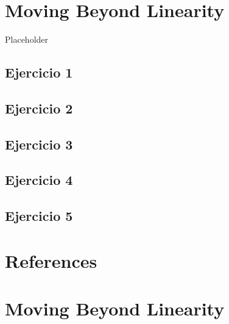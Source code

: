 \documentclass[
]{book}
\begin{document}
\hypertarget{moving-beyond-linearity}{%
\chapter{Moving Beyond Linearity}\label{moving-beyond-linearity}}

Placeholder

\hypertarget{ejercicio-1-1}{%
\section*{Ejercicio 1}\label{ejercicio-1-1}}

\hypertarget{ejercicio-2}{%
\section*{Ejercicio 2}\label{ejercicio-2}}

\hypertarget{ejercicio-3}{%
\section*{Ejercicio 3}\label{ejercicio-3}}

\hypertarget{ejercicio-4-1}{%
\section*{Ejercicio 4}\label{ejercicio-4-1}}

\hypertarget{ejercicio-5-1}{%
\section*{Ejercicio 5}\label{ejercicio-5-1}}

\hypertarget{references}{%
\chapter*{References}\label{references}}

\hypertarget{moving-beyond-linearity-1}{%
\chapter{Moving Beyond Linearity}\label{moving-beyond-linearity-1}}
\end{document}

